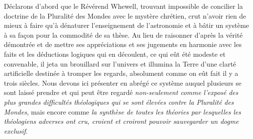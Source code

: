 \documentclass[a4paper, 11pt, oneside, landscape]{article}
\begin{document}
Déclarons d'abord que le Révérend Whewell, trouvant impossible de concilier la doctrine de la Pluralité des Mondes avec le mystère chrétien, crut n'avoir rien de mieux à faire qu'à dénaturer l'enseignement de l'astronomie et à bâtir un système à sa façon pour la commodité de sa thèse. Au lieu de raisonner d'après la vérité démontrée et de mettre ses appréciations et ses jugements en harmonie avec les faits et les déductions logiques qui en découlent, ce qui eût été modeste et convenable, il jeta un brouillard sur l'univers et illumina la Terre d'une clarté artificielle destinée à tromper les regards, absolument comme on eût fait il y a trois siècles. Nous devons ici présenter en abrégé ce système auquel plusieurs se sont laissé prendre et qui peut être regardé \emph{non-seulement comme l'exposé des plus grandes difficultés théologiques qui se sont élevées contre la Pluralité des Mondes}, mais encore comme \emph{la synthèse de toutes les théories par lesquelles les théologiens adverses ont cru, croient et croiront pouvoir sauvegarder un dogme exclusif}.
\end{document}
